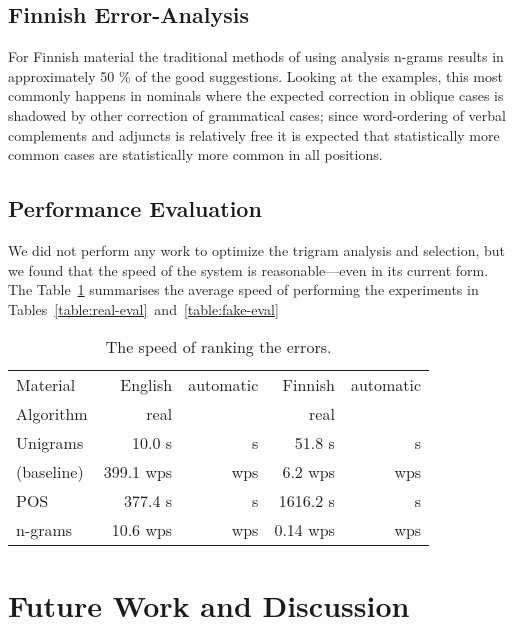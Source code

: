 \documentclass{llncs}
\begin{document}
\subsection{Finnish Error-Analysis}

For Finnish material the traditional methods of using analysis n-grams results
in approximately 50 \% of the good suggestions. Looking at the examples, this
most commonly happens in nominals where the expected correction in oblique
cases is shadowed by other correction of grammatical cases; since word-ordering
of verbal complements and adjuncts is relatively free it is expected that
statistically more common cases are statistically more common in all positions.

\subsection{Performance Evaluation}

We did not perform any work to optimize the trigram analysis and selection,
but we found that the speed of the system is reasonable---even in its current
form. The Table~\ref{table:speed-eval} summarises the average
speed of performing the experiments in Tables~\ref{table:real-eval}~and~\ref{table:fake-eval}

\begin{table}[h]
    \caption{The speed of ranking the errors.
    \label{table:speed-eval}}
  \begin{center}
    \begin{scriptsize}
      \begin{tabular}{lrrrr}
        \hline
        Material  & English & automatic & Finnish & automatic \\
        Algorithm & real    &           & real    &           \\
        \hline
        Unigrams   &    10.0 s &      s & 51.8 s &     s  \\
        (baseline) & 399.1 wps &    wps & 6.2 wps &   wps  \\
        \hline
        POS      &   377.4 s &     s & 1616.2 s &     s  \\
        n-grams  & 10.6  wps &   wps & 0.14 wps &   wps  \\
        \hline
      \end{tabular}
    \end{scriptsize}
  \end{center}
\end{table}


\section{Future Work and Discussion}
\label{sec:future-work}
\end{document}
